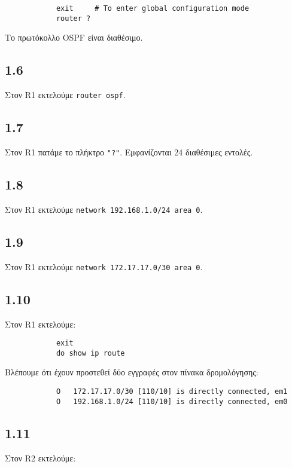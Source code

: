 \documentclass[a4paper, 12pt]{article}
\begin{document}
		\begin{verbatim}
			exit     # To enter global configuration mode
			router ?
		\end{verbatim}
		
		Το πρωτόκολλο OSPF είναι διαθέσιμο.

	\subsection*{1.6}
		Στον R1 εκτελούμε \verb|router ospf|.

	\subsection*{1.7}
		Στον R1 πατάμε το πλήκτρο \verb|"?"|. Εμφανίζονται 24 διαθέσιμες εντολές.

	\subsection*{1.8}
		Στον R1 εκτελούμε \verb|network 192.168.1.0/24 area 0|.

	\subsection*{1.9}
		Στον R1 εκτελούμε \verb|network 172.17.17.0/30 area 0|.

	\subsection*{1.10}
		Στον R1 εκτελούμε:
		
		\begin{verbatim}
			exit
			do show ip route
		\end{verbatim}
		
		Βλέπουμε ότι έχουν προστεθεί δύο εγγραφές στον πίνακα δρομολόγησης:
		
		\begin{verbatim}
			O   172.17.17.0/30 [110/10] is directly connected, em1
			O   192.168.1.0/24 [110/10] is directly connected, em0
		\end{verbatim}

	\subsection*{1.11}
		Στον R2 εκτελούμε:
		
\end{document}
